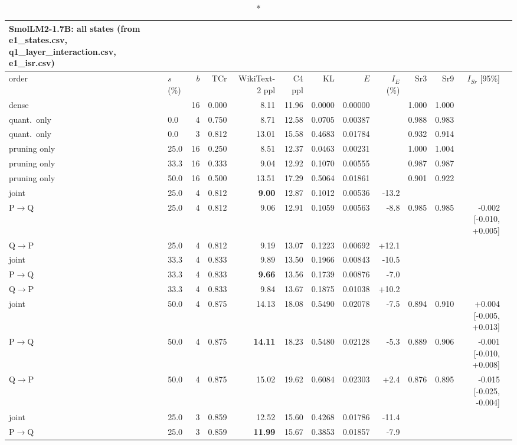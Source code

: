 \documentclass{article}
\begin{document}
\clearpage
\begin{longtable}{llrrrrrrrrrrl}
\caption*{\textbf{SmolLM2-1.7B}: all states (from e1\_states.csv, q1\_layer\_interaction.csv, e1\_isr.csv)}\\
\toprule order & $s$ (\%) & $b$ & TCr & WikiText-2 ppl & C4 ppl & KL & $E$ & $I_E$ (\%) & Sr3 & Sr9 & $I_{Sr}$ [95\%] \\ \midrule \endhead
dense &  & 16 & 0.000 & 8.11 & 11.96 & 0.0000 & 0.00000 &  & 1.000 & 1.000 &  \\
quant.\ only & 0.0 & 4 & 0.750 & 8.71 & 12.58 & 0.0705 & 0.00387 &  & 0.988 & 0.983 &  \\
quant.\ only & 0.0 & 3 & 0.812 & 13.01 & 15.58 & 0.4683 & 0.01784 &  & 0.932 & 0.914 &  \\
pruning only & 25.0 & 16 & 0.250 & 8.51 & 12.37 & 0.0463 & 0.00231 &  & 1.000 & 1.004 &  \\
pruning only & 33.3 & 16 & 0.333 & 9.04 & 12.92 & 0.1070 & 0.00555 &  & 0.987 & 0.987 &  \\
pruning only & 50.0 & 16 & 0.500 & 13.51 & 17.29 & 0.5064 & 0.01861 &  & 0.901 & 0.922 &  \\
joint & 25.0 & 4 & 0.812 & \textbf{9.00} & 12.87 & 0.1012 & 0.00536 & -13.2 &  &  &  \\
P$\to$Q & 25.0 & 4 & 0.812 & 9.06 & 12.91 & 0.1059 & 0.00563 & -8.8 & 0.985 & 0.985 & -0.002 [-0.010, +0.005] \\
Q$\to$P & 25.0 & 4 & 0.812 & 9.19 & 13.07 & 0.1223 & 0.00692 & +12.1 &  &  &  \\
joint & 33.3 & 4 & 0.833 & 9.89 & 13.50 & 0.1966 & 0.00843 & -10.5 &  &  &  \\
P$\to$Q & 33.3 & 4 & 0.833 & \textbf{9.66} & 13.56 & 0.1739 & 0.00876 & -7.0 &  &  &  \\
Q$\to$P & 33.3 & 4 & 0.833 & 9.84 & 13.67 & 0.1875 & 0.01038 & +10.2 &  &  &  \\
joint & 50.0 & 4 & 0.875 & 14.13 & 18.08 & 0.5490 & 0.02078 & -7.5 & 0.894 & 0.910 & +0.004 [-0.005, +0.013] \\
P$\to$Q & 50.0 & 4 & 0.875 & \textbf{14.11} & 18.23 & 0.5480 & 0.02128 & -5.3 & 0.889 & 0.906 & -0.001 [-0.010, +0.008] \\
Q$\to$P & 50.0 & 4 & 0.875 & 15.02 & 19.62 & 0.6084 & 0.02303 & +2.4 & 0.876 & 0.895 & -0.015 [-0.025, -0.004] \\
joint & 25.0 & 3 & 0.859 & 12.52 & 15.60 & 0.4268 & 0.01786 & -11.4 &  &  &  \\
P$\to$Q & 25.0 & 3 & 0.859 & \textbf{11.99} & 15.67 & 0.3853 & 0.01857 & -7.9 &  &  &  \\

\end{longtable}
\end{document}
